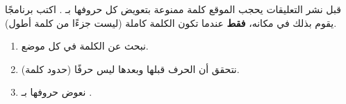 \begin{statement}
قبل نشر التعليقات يحجب الموقع كلمة ممنوعة بتعويض كل حروفها بـ \code{*}. اكتب برنامجًا يقوم بذلك في مكانه، \textbf{فقط} عندما تكون الكلمة كاملة (ليست جزءًا من كلمة أطول).
\end{statement}
\begin{stepsbox}\begin{enumerate}
\item نبحث عن الكلمة في كل موضع.
\item نتحقق أن الحرف قبلها وبعدها ليس حرفًا (حدود كلمة).
\item نعوض حروفها بـ \code{*}.
\end{enumerate}\end{stepsbox}
